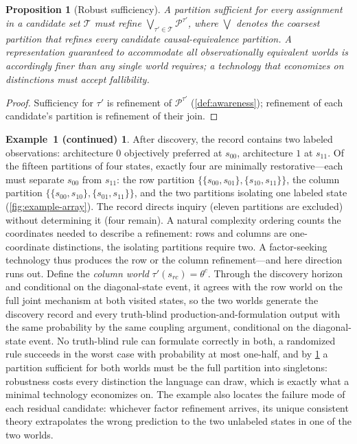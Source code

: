 \documentclass[11pt]{article}
\newtheorem{proposition}[assumption]{Proposition}
\theoremstyle{definition}
\newtheorem*{excont}{Example~1 (continued)}
\begin{document}
\begin{proposition}[Robust sufficiency]
\label{prop:robust-sufficiency}
A partition sufficient for every assignment in a candidate set $\mathcal T$ must refine $\bigvee_{\tau'\in\mathcal T}\mathcal P^{\tau'}$, where $\bigvee$ denotes the coarsest partition that refines every candidate causal-equivalence partition.
A representation guaranteed to accommodate all observationally equivalent worlds is accordingly finer than any single world requires; a technology that economizes on distinctions must accept fallibility.
\end{proposition}

\begin{proof}
Sufficiency for $\tau'$ is refinement of $\mathcal P^{\tau'}$ (\cref{def:awareness}); refinement of each candidate's partition is refinement of their join.
\end{proof}

\begin{excont}
After discovery, the record contains two labeled observations: architecture $0$ objectively preferred at $s_{00}$, architecture $1$ at $s_{11}$.
Of the fifteen partitions of four states, exactly four are minimally restorative---each must separate $s_{00}$ from $s_{11}$: the row partition $\{\{s_{00},s_{01}\},\{s_{10},s_{11}\}\}$, the column partition $\{\{s_{00},s_{10}\},\{s_{01},s_{11}\}\}$, and the two partitions isolating one labeled state (\cref{fig:example-array}).
The record directs inquiry (eleven partitions are excluded) without determining it (four remain).
A natural complexity ordering counts the coordinates needed to describe a refinement: rows and columns are one-coordinate distinctions, the isolating partitions require two.
A factor-seeking technology thus produces the row or the column refinement---and here direction runs out.
Define the \emph{column world} $\tau'(s_{rc})=\theta^{c}$.
Through the discovery horizon and conditional on the diagonal-state event, it agrees with the row world on the full joint mechanism at both visited states, so the two worlds generate the discovery record and every truth-blind production-and-formulation output with the same probability by the same coupling argument, conditional on the diagonal-state event.
No truth-blind rule can formulate correctly in both, a randomized rule succeeds in the worst case with probability at most one-half, and by \cref{prop:robust-sufficiency} a partition sufficient for both worlds must be the full partition into singletons: robustness costs every distinction the language can draw, which is exactly what a minimal technology economizes on.
The example also locates the failure mode of each residual candidate: whichever factor refinement arrives, its unique consistent theory extrapolates the wrong prediction to the two unlabeled states in one of the two worlds.
\end{excont}
\end{document}
